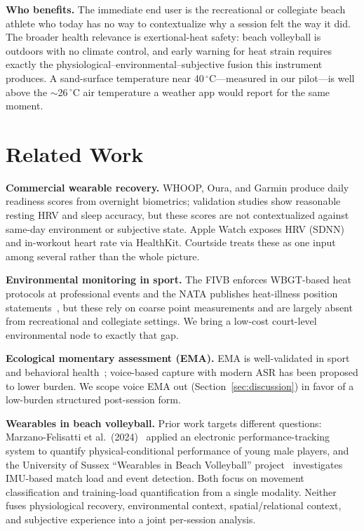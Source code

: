 \documentclass[sigconf,nonacm]{acmart}
\begin{document}
\textbf{Who benefits.} The immediate end user is the recreational or collegiate beach athlete who today has no way to contextualize why a session felt the way it did. The broader health relevance is exertional-heat safety: beach volleyball is outdoors with no climate control, and early warning for heat strain requires exactly the physiological--environmental--subjective fusion this instrument produces. A sand-surface temperature near 40\,$^\circ$C---measured in our pilot---is well above the $\sim$26\,$^\circ$C air temperature a weather app would report for the same moment.

\section{Related Work}
\textbf{Commercial wearable recovery.} WHOOP, Oura, and Garmin produce daily readiness scores from overnight biometrics; validation studies show reasonable resting HRV and sleep accuracy, but these scores are not contextualized against same-day environment or subjective state. Apple Watch exposes HRV (SDNN) and in-workout heart rate via HealthKit. Courtside treats these as one input among several rather than the whole picture.

\textbf{Environmental monitoring in sport.} The FIVB enforces WBGT-based heat protocols at professional events and the NATA publishes heat-illness position statements~\cite{casa2015}, but these rely on coarse point measurements and are largely absent from recreational and collegiate settings. We bring a low-cost court-level environmental node to exactly that gap.

\textbf{Ecological momentary assessment (EMA).} EMA is well-validated in sport and behavioral health~\cite{shiffman2008}; voice-based capture with modern ASR has been proposed to lower burden. We scope voice EMA out (Section~\ref{sec:discussion}) in favor of a low-burden structured post-session form.

\textbf{Wearables in beach volleyball.} Prior work targets different questions: Marzano-Felisatti et al.\ (2024)~\cite{marzano2024} applied an electronic performance-tracking system to quantify physical-conditional performance of young male players, and the University of Sussex ``Wearables in Beach Volleyball'' project~\cite{sussex} investigates IMU-based match load and event detection. Both focus on movement classification and training-load quantification from a single modality. Neither fuses physiological recovery, environmental context, spatial/relational context, and subjective experience into a joint per-session analysis.
\end{document}
